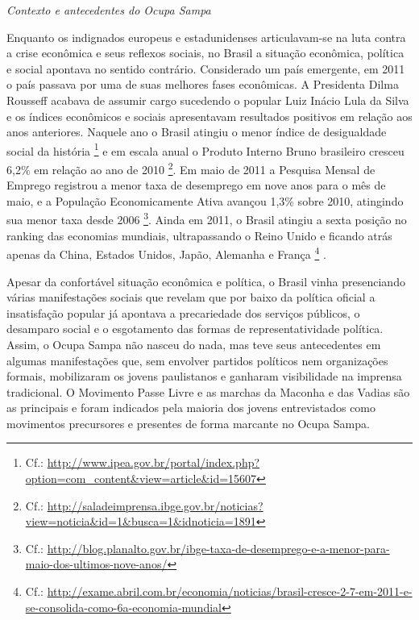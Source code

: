 \emph{Contexto e antecedentes do Ocupa Sampa}

Enquanto os indignados europeus e estadunidenses articulavam-se na luta
contra a crise econômica e seus reflexos sociais, no Brasil a situação
econômica, política e social apontava no sentido contrário. Considerado
um país emergente, em 2011 o país passava por uma de suas melhores fases
econômicas. A Presidenta Dilma Rousseff acabava de assumir cargo
sucedendo o popular Luiz Inácio Lula da Silva e os índices econômicos e
sociais apresentavam resultados positivos em relação aos anos
anteriores. Naquele ano o Brasil atingiu o menor índice de desigualdade
social da história \footnote{Cf.:
  \url{http://www.ipea.gov.br/portal/index.php?option=com_content\&view=article\&id=15607}}
e em escala anual o Produto Interno Bruno brasileiro cresceu 6,2\% em
relação ao ano de 2010 \footnote{Cf.:
  \url{http://saladeimprensa.ibge.gov.br/noticias?view=noticia\&id=1\&busca=1\&idnoticia=1891}}.
Em maio de 2011 a Pesquisa Mensal de Emprego registrou a menor taxa de
desemprego em nove anos para o mês de maio, e a População Economicamente
Ativa avançou 1,3\% sobre 2010, atingindo sua menor taxa desde 2006
\footnote{Cf.:
  \url{http://blog.planalto.gov.br/ibge-taxa-de-desemprego-e-a-menor-para-maio-dos-ultimos-nove-anos/}}.
Ainda em 2011, o Brasil atingiu a sexta posição no ranking das economias
mundiais, ultrapassando o Reino Unido e ficando atrás apenas da China,
Estados Unidos, Japão, Alemanha e França \footnote{Cf.:
  \url{http://exame.abril.com.br/economia/noticias/brasil-cresce-2-7-em-2011-e-se-consolida-como-6a-economia-mundial}}
.

Apesar da confortável situação econômica e política, o Brasil vinha
presenciando várias manifestações sociais que revelam que por baixo da
política oficial a insatisfação popular já apontava a precariedade dos
serviços públicos, o desamparo social e o esgotamento das formas de
representatividade política. Assim, o Ocupa Sampa não nasceu do nada,
mas teve seus antecedentes em algumas manifestações que, sem envolver
partidos políticos nem organizações formais, mobilizaram os jovens
paulistanos e ganharam visibilidade na imprensa tradicional. O Movimento
Passe Livre e as marchas da Maconha e das Vadias são as principais e
foram indicados pela maioria dos jovens entrevistados como movimentos
precursores e presentes de forma marcante no Ocupa Sampa.

